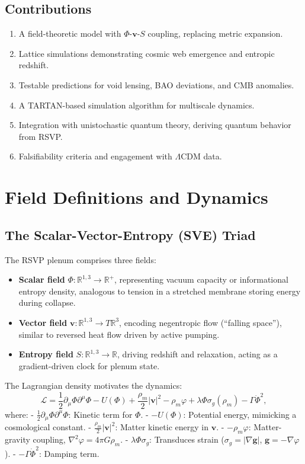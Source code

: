 \documentclass[11pt]{article}
\theoremstyle{plain}
\theoremstyle{definition}
\begin{document}
\subsection{Contributions}
\begin{enumerate}
    \item A field-theoretic model with $\Phi$-$\bm{v}$-$S$ coupling, replacing metric expansion.
    \item Lattice simulations demonstrating cosmic web emergence and entropic redshift.
    \item Testable predictions for void lensing, BAO deviations, and CMB anomalies.
    \item A TARTAN-based simulation algorithm for multiscale dynamics.
    \item Integration with unistochastic quantum theory, deriving quantum behavior from RSVP.
    \item Falsifiability criteria and engagement with $\Lambda$CDM data.
\end{enumerate}

\section{Field Definitions and Dynamics}
\label{sec:rsvp_fields}
\subsection{The Scalar-Vector-Entropy (SVE) Triad}
The RSVP plenum comprises three fields:
\begin{itemize}
    \item \textbf{Scalar field} $\Phi: \mathbb{R}^{1,3} \to \mathbb{R}^+$, representing vacuum capacity or informational entropy density, analogous to tension in a stretched membrane storing energy during collapse.
    \item \textbf{Vector field} $\bm{v}: \mathbb{R}^{1,3} \to T\mathbb{R}^3$, encoding negentropic flow (“falling space”), similar to reversed heat flow driven by active pumping.
    \item \textbf{Entropy field} $S: \mathbb{R}^{1,3} \to \mathbb{R}$, driving redshift and relaxation, acting as a gradient-driven clock for plenum state.
\end{itemize}

The Lagrangian density motivates the dynamics:
\begin{equation}
\mathcal{L} = \frac{1}{2} \partial_\mu \Phi \partial^\mu \Phi - U(\Phi) + \frac{\rho_m}{2} |\bm{v}|^2 - \rho_m \varphi + \lambda \Phi \sigma_g(\rho_m) - \Gamma \dot{\Phi}^2,
\label{eq:L}
\end{equation}
where:
- $\frac{1}{2} \partial_\mu \Phi \partial^\mu \Phi$: Kinetic term for $\Phi$.
- $-U(\Phi)$: Potential energy, mimicking a cosmological constant.
- $\frac{\rho_m}{2} |\bm{v}|^2$: Matter kinetic energy in $\bm{v}$.
- $-\rho_m \varphi$: Matter-gravity coupling, $\nabla^2 \varphi = 4\pi G \rho_m$.
- $\lambda \Phi \sigma_g$: Transduces strain ($\sigma_g = |\nabla \bm{g}|$, $\bm{g} = -\nabla \varphi$).
- $-\Gamma \dot{\Phi}^2$: Damping term.
\end{document}
